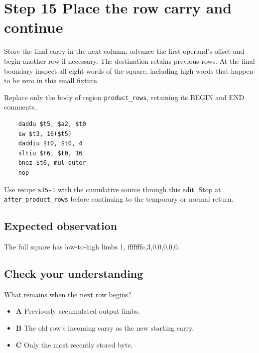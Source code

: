 \section{Step 15 Place the row carry and continue}\label{rsa-s15}

Store the final carry in the next column, advance the first operand's offset and begin another row if necessary. The destination retains previous rows. At the final boundary inspect all eight words of the square, including high words that happen to be zero in this small fixture.

Replace only the body of region \texttt{product\_rows}, retaining its BEGIN and END comments.

\begin{verbatim}
    daddu $t5, $a2, $t0
    sw $t3, 16($t5)
    daddiu $t0, $t0, 4
    sltiu $t6, $t0, 16
    bnez $t6, mul_outer
    nop
\end{verbatim}

Use recipe \texttt{s15-1} with the cumulative source through this edit. Stop at \texttt{after\_product\_rows} before continuing to the temporary or normal return.

\subsection{Expected observation}
The full square has low-to-high limbs 1, fffffffc,3,0,0,0,0,0.

\subsection{Check your understanding}
What remains when the next row begins?

\begin{itemize}
\item \textbf{A} Previously accumulated output limbs.
\item \textbf{B} The old row's incoming carry as the new starting carry.
\item \textbf{C} Only the most recently stored byte.
\end{itemize}
